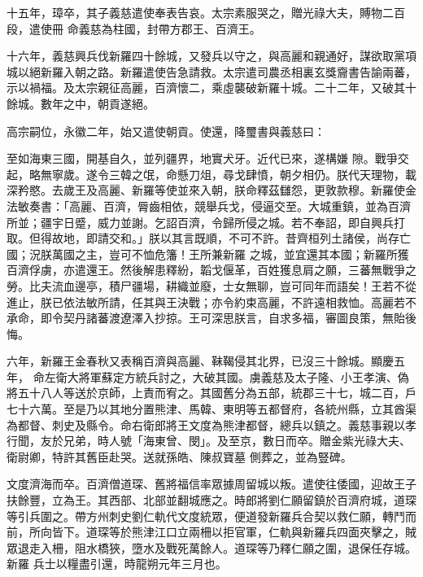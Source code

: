 \begin{pinyinscope}
 十五年，璋卒，其子義慈遣使奉表告哀。太宗素服哭之，贈光祿大夫，賻物二百段，遣使冊
 命義慈為柱國，封帶方郡王、百濟王。



 十六年，義慈興兵伐新羅四十餘城，又發兵以守之，與高麗和親通好，謀欲取黨項城以絕新羅入朝之路。新羅遣使告急請救。太宗遣司農丞相裏玄獎齎書告諭兩蕃，示以禍福。及太宗親征高麗，百濟懷二，乘虛襲破新羅十城。二十二年，又破其十餘城。數年之中，朝貢遂絕。



 高宗嗣位，永徽二年，始又遣使朝貢。使還，降璽書與義慈曰：



 至如海東三國，開基自久，並列疆界，地實犬牙。近代已來，遂構嫌
 隙。戰爭交起，略無寧歲。遂令三韓之氓，命懸刀俎，尋戈肆憤，朝夕相仍。朕代天理物，載深矜愍。去歲王及高麗、新羅等使並來入朝，朕命釋茲讎怨，更敦款穆。新羅使金法敏奏書：「高麗、百濟，脣齒相依，競舉兵戈，侵逼交至。大城重鎮，並為百濟所並；疆宇日蹙，威力並謝。乞詔百濟，令歸所侵之城。若不奉詔，即自興兵打取。但得故地，即請交和。」朕以其言既順，不可不許。昔齊桓列土諸侯，尚存亡國；況朕萬國之主，豈可不恤危籓！王所兼新羅
 之城，並宜還其本國；新羅所獲百濟俘虜，亦遣還王。然後解患釋紛，韜戈偃革，百姓獲息肩之願，三蕃無戰爭之勞。比夫流血邊亭，積尸疆場，耕織並廢，士女無聊，豈可同年而語矣！王若不從進止，朕已依法敏所請，任其與王決戰；亦令約束高麗，不許遠相救恤。高麗若不承命，即令契丹諸蕃渡遼澤入抄掠。王可深思朕言，自求多福，審圖良策，無貽後悔。



 六年，新羅王金春秋又表稱百濟與高麗、靺鞨侵其北界，已沒三十餘城。顯慶五年，
 命左衛大將軍蘇定方統兵討之，大破其國。虜義慈及太子隆、小王孝演、偽將五十八人等送於京師，上責而宥之。其國舊分為五部，統郡三十七，城二百，戶七十六萬。至是乃以其地分置熊津、馬韓、東明等五都督府，各統州縣，立其酋渠為都督、刺史及縣令。命右衛郎將王文度為熊津都督，總兵以鎮之。義慈事親以孝行聞，友於兄弟，時人號「海東曾、閔」。及至京，數日而卒。贈金紫光祿大夫、衛尉卿，特許其舊臣赴哭。送就孫皓、陳叔寶墓
 側葬之，並為豎碑。



 文度濟海而卒。百濟僧道琛、舊將福信率眾據周留城以叛。遣使往倭國，迎故王子扶餘豐，立為王。其西部、北部並翻城應之。時郎將劉仁願留鎮於百濟府城，道琛等引兵圍之。帶方州刺史劉仁軌代文度統眾，便道發新羅兵合契以救仁願，轉鬥而前，所向皆下。道琛等於熊津江口立兩柵以拒官軍，仁軌與新羅兵四面夾擊之，賊眾退走入柵，阻水橋狹，墮水及戰死萬餘人。道琛等乃釋仁願之圍，退保任存城。新羅
 兵士以糧盡引還，時龍朔元年三月也。




\end{pinyinscope}
